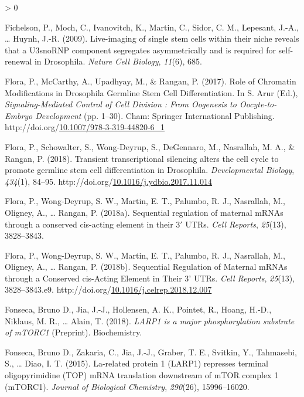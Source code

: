 \documentclass[12pt,oneside]{reedthesis}
\newlength{\cslhangindent}
\newenvironment{CSLReferences}[2] %
 {%
  \setlength{\parindent}{0pt}
  \ifodd #1 \everypar{\setlength{\hangindent}{\cslhangindent}}\ignorespaces\fi
  \ifnum #2 > 0
  \setlength{\parskip}{#2\baselineskip}
  \fi
 }%
 {}
\begin{document}
\begin{CSLReferences}{1}{0}
\leavevmode\hypertarget{ref-Fichelson2009a}{}%
Fichelson, P., Moch, C., Ivanovitch, K., Martin, C., Sidor, C. M., Lepesant, J.-A., \ldots{} Huynh, J.-R. (2009). Live-imaging of single stem cells within their niche reveals that a {U3snoRNP} component segregates asymmetrically and is required for self-renewal in {Drosophila}. \emph{Nature Cell Biology}, \emph{11}(6), 685.

\leavevmode\hypertarget{ref-floraRoleChromatinModifications2017}{}%
Flora, P., McCarthy, A., Upadhyay, M., \& Rangan, P. (2017). Role of {Chromatin Modifications} in {Drosophila Germline Stem Cell Differentiation}. In S. Arur (Ed.), \emph{Signaling-{Mediated Control} of {Cell Division} : {From Oogenesis} to {Oocyte-to-Embryo Development}} (pp. 1--30). {Cham}: {Springer International Publishing}. http://doi.org/\href{https://doi.org/10.1007/978-3-319-44820-6_1}{10.1007/978-3-319-44820-6\_1}

\leavevmode\hypertarget{ref-Flora2018l}{}%
Flora, P., Schowalter, S., Wong-Deyrup, S., DeGennaro, M., Nasrallah, M. A., \& Rangan, P. (2018). Transient transcriptional silencing alters the cell cycle to promote germline stem cell differentiation in {Drosophila}. \emph{Developmental Biology}, \emph{434}(1), 84--95. http://doi.org/\href{https://doi.org/10.1016/j.ydbio.2017.11.014}{10.1016/j.ydbio.2017.11.014}

\leavevmode\hypertarget{ref-flora2018sequential}{}%
Flora, P., Wong-Deyrup, S. W., Martin, E. T., Palumbo, R. J., Nasrallah, M., Oligney, A., \ldots{} Rangan, P. (2018a). Sequential regulation of maternal {mRNAs} through a conserved cis-acting element in their 3{\({'}\)} {UTRs}. \emph{Cell Reports}, \emph{25}(13), 3828--3843.

\leavevmode\hypertarget{ref-Flora2018k}{}%
Flora, P., Wong-Deyrup, S. W., Martin, E. T., Palumbo, R. J., Nasrallah, M., Oligney, A., \ldots{} Rangan, P. (2018b). Sequential {Regulation} of {Maternal mRNAs} through a {Conserved} cis-{Acting Element} in {Their} 3' {UTRs}. \emph{Cell Reports}, \emph{25}(13), 3828--3843.e9. http://doi.org/\href{https://doi.org/10.1016/j.celrep.2018.12.007}{10.1016/j.celrep.2018.12.007}

\leavevmode\hypertarget{ref-fonsecaLARP1MajorPhosphorylation2018}{}%
Fonseca, Bruno D., Jia, J.-J., Hollensen, A. K., Pointet, R., Hoang, H.-D., Niklaus, M. R., \ldots{} Alain, T. (2018). \emph{{LARP1} is a major phosphorylation substrate of {mTORC1}} (Preprint). {Biochemistry}.

\leavevmode\hypertarget{ref-Fonseca2015a}{}%
Fonseca, Bruno D., Zakaria, C., Jia, J.-J., Graber, T. E., Svitkin, Y., Tahmasebi, S., \ldots{} Diao, I. T. (2015). La-related protein 1 ({LARP1}) represses terminal oligopyrimidine ({TOP}) {mRNA} translation downstream of {mTOR} complex 1 ({mTORC1}). \emph{Journal of Biological Chemistry}, \emph{290}(26), 15996--16020.


\end{CSLReferences}
\end{document}
